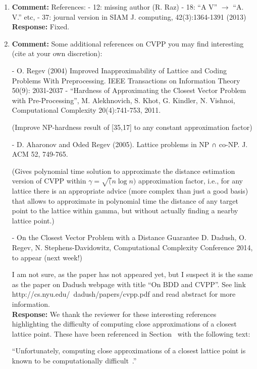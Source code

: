 \documentclass[a4paper,10pt]{article}
\begin{document}
\begin{enumerate}
\item\textbf{Comment:}  
References: 
- 12: missing author (R. Raz) 
- 18: ``A V'' $\to$ ``A. V.'' etc, 
- 37: journal version in SIAM J. computing, 42(3):1364-1391 (2013) 
\\\textbf{Response:}
Fixed.

\item\textbf{Comment:}  
Some additional references on CVPP you may find interesting 
(cite at your own discretion): 

- O. Regev (2004) Improved Inapproximability of Lattice and Coding Problems With Preprocessing. IEEE Transactions on Information Theory 50(9): 2031-2037 
- ``Hardness of Approximating the Closest Vector Problem with Pre-Processing'', M. Alekhnovich, S. Khot, G. Kindler, N. Vishnoi, Computational Complexity 20(4):741-753, 2011. 

(Improve NP-hardness result of [35,17] to any constant approximation factor) 

- D. Aharonov and Oded Regev (2005). Lattice problems in NP ∩ co-NP. J. ACM 52, 749-765. 

(Gives polynomial time solution to approximate the distance estimation version of CVPP within $\gamma=\sqrt(n \log n)$ approximation factor, i.e., for any lattice there is an appropriate advice (more complex than just a good basis) that allows to approximate in polynomial time the distance of any target point to the lattice within gamma, but without actually finding a nearby lattice point.) 

- On the Closest Vector Problem with a Distance Guarantee 
D. Dadush, O. Regev, N. Stephens-Davidowitz, Computational Complexity Conference 2014, to appear (next week!) 

I am not sure, as the paper has not appeared yet, but I suspect it is the same as the paper on Dadush webpage with title ``On BDD and CVPP''. 
See link 
http://cs.nyu.edu/~dadush/papers/cvpp.pdf 
and read abstract for more information.
\\\textbf{Response:}
We thank the reviewer for these interesting references highlighting the difficulty of computing close approximations of a closest lattice point.  These have been referenced in Section~ with the following text:

``Unfortunately, computing close approximations of a closest lattice point is known to be computationally difficult~\cite{feige_inapproximability_2004,Regev_2004_inappox_lattice_with_preprocessing,Aharonov_Regev_2005,Aleknovish_hardness_with_preprocessing_2011,Dadush_cvp_with_distance_guarantee_2014}.''

\end{enumerate}




%

\end{document}
